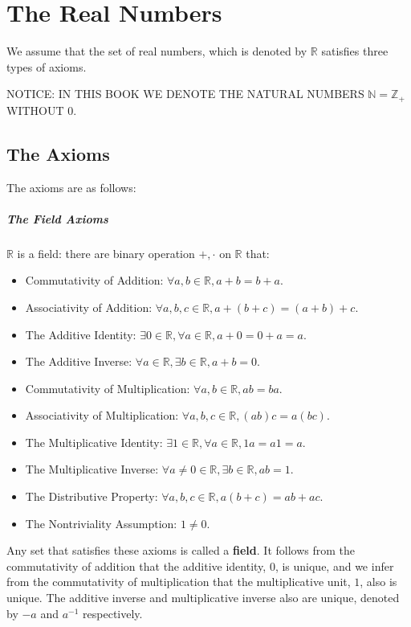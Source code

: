 \documentclass[../main.tex]{subfiles}
\begin{document}
\chapter{The Real Numbers}

We assume that the set of real numbers, which is denoted by $\mathbb{R}$ satisfies three types of axioms.

NOTICE: IN THIS BOOK WE DENOTE THE NATURAL NUMBERS $\mathbb{N} = \mathbb{Z}_+$ WITHOUT $0$.

\section{The Axioms}
The axioms are as follows:

\paragraph{The Field Axioms} $\mathbb{R}$ is a field: there are binary operation $+, \cdot $ on $\mathbb{R}$ that:
\begin{itemize}
	\item Commutativity of Addition: $\forall a,b\in \mathbb{R}, a+b=b+a$.
	\item Associativity of Addition: $\forall a,b,c\in \mathbb{R}, a+(b+c) = (a+b)+c$.
	\item The Additive Identity: $\exists 0\in \mathbb{R}, \forall a\in \mathbb{R},a+0=0+a=a$.
	\item The Additive Inverse: $\forall a\in \mathbb{R}, \exists b\in \mathbb{R}, a+b=0$.
	\item Commutativity of Multiplication: $\forall a,b\in \mathbb{R}, ab=ba$.
	\item Associativity of Multiplication: $\forall a,b,c\in \mathbb{R}, (ab)c=a(bc)$.
	\item The Multiplicative Identity: $\exists 1 \in \mathbb{R}, \forall a\in \mathbb{R}, 1a=a 1=a$.
	\item The Multiplicative Inverse: $\forall a\neq 0 \in \mathbb{R}, \exists b\in \mathbb{R}, ab=1$.
	\item The Distributive Property: $\forall a,b,c\in \mathbb{R}, a(b+c) = ab+ac$.
	\item The Nontriviality Assumption: $1 \neq 0$.
\end{itemize}

Any set that satisfies these axioms is called a \textbf{field}. It follows from the commutativity of addition that the additive identity, $0$, is unique, and we infer from the commutativity of multiplication that the multiplicative unit, $1$, also is unique. The additive inverse and multiplicative inverse also are unique, denoted by $-a$ and $a^{-1}$ respectively.
\end{document}

